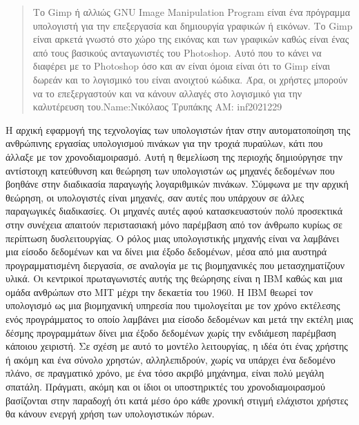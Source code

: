\documentclass[
]{article}
\begin{document}
\begin{quote}
Το Gimp ή αλλιώς GNU Image Manipulation Program είναι ένα πρόγραμμα
υπολογιστή για την επεξεργασία και δημιουργία γραφικών ή εικόνων. Το
Gimp είναι αρκετά γνωστό στο χώρο της εικόνας και των γραφικών καθώς
είναι ένας από τους βασικούς ανταγωνιστές του Photoshop. Αυτό που το
κάνει να διαφέρει με το Photoshop όσο και αν είναι όμοια είναι ότι το
Gimp είναι δωρεάν και το λογισμικό του είναι ανοιχτού κώδικα. Άρα, οι
χρήστες μπορούν να το επεξεργαστούν και να κάνουν αλλαγές στο λογισμικό
για την καλυτέρευση του.Name:Νικόλαος Τρυπάκης AM: inf2021229
\end{quote}

Η αρχική εφαρμογή της τεχνολογίας των υπολογιστών ήταν στην
αυτοματοποίηση της ανθρώπινης εργασίας υπολογισμού πινάκων για την
τροχιά πυραύλων, κάτι που άλλαξε με τον χρονοδιαμοιρασμό. Αυτή η
θεμελίωση της περιοχής δημιούργησε την αντίστοιχη κατεύθυνση και θεώρηση
των υπολογιστών ως μηχανές δεδομένων που βοηθάνε στην διαδικασία
παραγωγής λογαριθμικών πινάκων. Σύμφωνα με την αρχική θεώρηση, οι
υπολογιστές είναι μηχανές, σαν αυτές που υπάρχουν σε άλλες παραγωγικές
διαδικασίες. Οι μηχανές αυτές αφού κατασκευαστούν πολύ προσεκτικά στην
συνέχεια απαιτούν περιστασιακή μόνο παρέμβαση από τον άνθρωπο κυρίως σε
περίπτωση δυσλειτουργίας. Ο ρόλος μιας υπολογιστικής μηχανής είναι να
λαμβάνει μια είσοδο δεδομένων και να δίνει μια έξοδο δεδομένων, μέσα από
μια αυστηρά προγραμματισμένη διεργασία, σε αναλογία με τις βιομηχανικές
που μετασχηματίζουν υλικά. Οι κεντρικοί πρωταγωνιστές αυτής της θεώρησης
είναι η IBM καθώς και μια ομάδα ανθρώπων στο MIT μέχρι την δεκαετία του
1960. Η IBM θεωρεί τον υπολογισμό ως μια βιομηχανική υπηρεσία που
τιμολογείται με τον χρόνο εκτέλεσης ενός προγράμματος το οποίο λαμβάνει
μια είσοδο δεδομένων και μετά την εκτέλη μιας δέσμης προγραμμάτων δίνει
μια έξοδο δεδομένων χωρίς την ενδιάμεση παρέμβαση κάποιου χειριστή. Σε
σχέση με αυτό το μοντέλο λειτουργίας, η ιδέα ότι ένας χρήστης ή ακόμη
και ένα σύνολο χρηστών, αλληλεπιδρούν, χωρίς να υπάρχει ένα δεδομένο
πλάνο, σε πραγματικό χρόνο, με ένα τόσο ακριβό μηχάνημα, είναι πολύ
μεγάλη σπατάλη. Πράγματι, ακόμη και οι ίδιοι οι υποστηρικτές του
χρονοδιαμοιρασμού βασίζονται στην παραδοχή ότι κατά μέσο όρο κάθε
χρονική στιγμή ελάχιστοι χρήστες θα κάνουν ενεργή χρήση των
υπολογιστικών πόρων.
\end{document}
